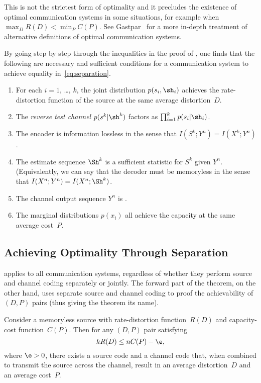 This is not the strictest form of optimality and it precludes the existence of
optimal communication systems in some situations, for example when $\max_D R(D)
< \min_P C(P)$. See Gastpar~\cite{GastparThesis} for a more in-depth treatment
of alternative definitions of optimal communication systems.

By going step by step through the inequalities in the proof of
, one finds that the following are necessary and
sufficient conditions for a communication
system to achieve equality in~\eqref{eq:separation}.
\begin{enumerate}
  \item For each $i = 1$, \dots, $k$, the joint distribution $p(s_i,\sh_i)$
    achieves the rate-distortion function of the source at the same average
    distortion~$D$.
  \item The \emph{reverse test channel} $p(s^k|\sh^k)$ factors as $\prod_{i=1}^k
    p(s_i | \sh_i)$. 
  \item The encoder is information lossless in the sense that $I(S^k;Y^n) =
    I(X^k; Y^n)$. 
  \item The estimate sequence $\Sh^k$ is a sufficient statistic for $S^k$ given
    $Y^n$. (Equivalently, we can say that the decoder must be memoryless in the
    sense that $I(X^n;Y^n) = I(X^n;\Sh^k)$.
  \item The channel output sequence $Y^n$ is \iid.
  \item The marginal distributions $p(x_i)$ all achieve the capacity at the same
    average cost~$P$.
\end{enumerate}


\subsection{Achieving Optimality Through Separation}

 applies to all communication systems, regardless of
whether they perform source and channel coding separately or jointly. The
forward part of the theorem, on the other hand, uses separate source and channel
coding to proof the achievability of $(D,P)$ pairs (thus giving the theorem its
name).

\begin{theorem}
  \label{thm:separationforward}
  Consider a memoryless source with rate-distortion function~$R(D)$ and
  capacity-cost function~$C(P)$. Then for any $(D,P)$ pair satisfying
  \begin{equation*}
    kR(D) \le n C(P) - \e,
  \end{equation*}
  where $\e > 0$, there exists a source code and a channel code that, when
  combined to transmit the source across the channel, result in an average
  distortion~$D$ and an average cost~$P$.
\end{theorem}

